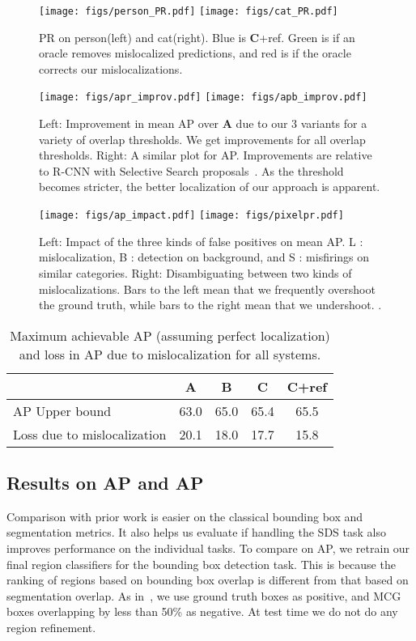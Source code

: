 \documentclass[runningheads]{llncs}
\newcommand\methodA{\textbf{A}}
\newcommand\methodB{\textbf{B}}
\newcommand\methodC{\textbf{C}}
\begin{document}
\begin{figure}
\centering
\texttt{[image: figs/person\_PR.pdf]}
\texttt{[image: figs/cat\_PR.pdf]}
\caption{PR on person(left) and cat(right). Blue is \methodC{}+ref. Green is if an oracle removes mislocalized predictions, and red is if the oracle corrects our mislocalizations.}
\label{personPR}
\end{figure}
\begin{figure}
\centering
\texttt{[image: figs/apr\_improv.pdf]}
\texttt{[image: figs/apb\_improv.pdf]}
\caption{Left: Improvement in mean AP over \methodA{} due to our 3 variants for a variety of overlap thresholds. We get improvements for all overlap thresholds. Right: A similar plot for AP. Improvements are relative to R-CNN with Selective Search proposals~\cite{GirshickCVPR14}. As the threshold becomes stricter, the better localization of our approach is apparent.}
\label{improvovthresh}
\end{figure}
\begin{figure}
\centering
\texttt{[image: figs/ap\_impact.pdf]}
\texttt{[image: figs/pixelpr.pdf]}
\caption{Left: Impact of the three kinds of false positives on mean AP.  L : mislocalization, B : detection on background, and S : misfirings on similar categories. Right: Disambiguating between two kinds of mislocalizations. Bars to the left mean that we frequently overshoot the ground truth, while bars to the right mean that we undershoot. .}
\label{misloc}
\end{figure}

\begin{table}
\centering
\caption{Maximum achievable AP (assuming perfect localization) and loss in AP due to mislocalization for all systems.}
\renewcommand{\tabcolsep}{1.5mm}
\begin{tabular}{l|cccc}
& \methodA{} & \methodB{} & \methodC{} & \methodC{}+ref\\
\hline
AP Upper bound & 63.0 & 65.0 & 65.4 & 65.5\\
Loss due to mislocalization & 20.1 & 18.0 & 17.7 & 15.8
\end{tabular}
\label{table:loc}
\end{table}
\subsection{Results on AP and AP}
Comparison with prior work is easier on the classical bounding box and segmentation metrics. It also helps us evaluate if handling the SDS task also improves performance on the individual tasks.
To compare on AP, we retrain our final region classifiers for the bounding box detection task. This is because the ranking of regions based on bounding box overlap is different from that based on segmentation overlap. As in~\cite{GirshickCVPR14}, we use ground truth boxes as positive, and MCG boxes overlapping by less than 50\% as negative. At test time we do not do any region refinement.
\end{document}
